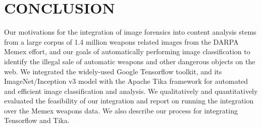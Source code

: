 \section{CONCLUSION} \label{sec:future}
Our motivations for the integration of image forensics into content analysis stems from a large corpus of 1.4 million weapons related images from the DARPA Memex effort, and our goals of automatically performing image classification to identify the illegal sale of automatic weapons and other dangerous objects on the web. We integrated the widely-used Google Tensorflow toolkit, and its ImageNet/Inception v3 model with the Apache Tika framework for automated and efficient image classification and analysis. We qualitatively and quantitatively evaluated the feasibility of our integration and report on running the integration over the Memex weapons data. We also describe our process for integrating Tensorflow and Tika. 
